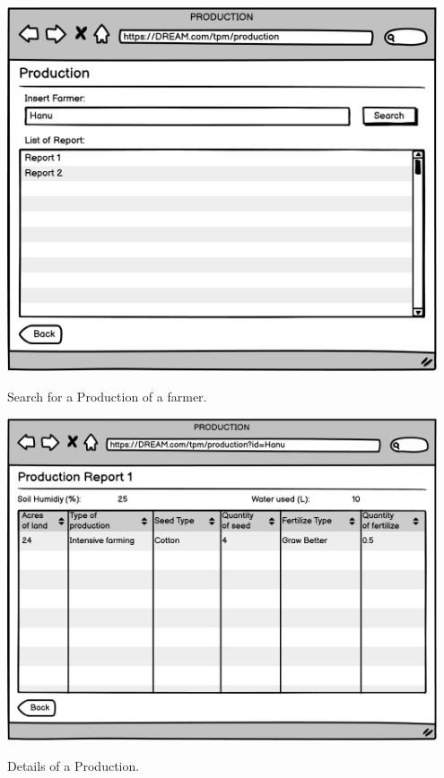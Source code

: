 \vspace{0.5cm}
\begin{minipage}{.5\textwidth}
	\centering
	\includegraphics[width=0.95\textwidth]{Images/Mockup/TPM/09TPMProduction.png}
	\captionsetup{type=figure}
	\caption{Search for a Production of a farmer.}
\end{minipage}%
\begin{minipage}{.5\textwidth}
	\centering
	\includegraphics[width=0.95\textwidth]{Images/Mockup/TPM/10TPMProductionReport.png}
	\captionsetup{type=figure}
	\caption{Details of a Production.}
\end{minipage}
\vspace{0.5cm}
